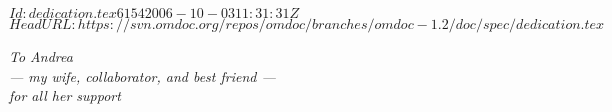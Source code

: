 \svnInfo $Id: dedication.tex 6154 2006-10-03 11:31:31Z  $
\svnKeyword $HeadURL: https://svn.omdoc.org/repos/omdoc/branches/omdoc-1.2/doc/spec/dedication.tex $

\thispagestyle{empty}
\vspace*{3.5cm}
\begin{center}\LARGE\sl
  To Andrea\\
  --- my wife, collaborator, and best friend ---\\
  for all her support
\end{center}


